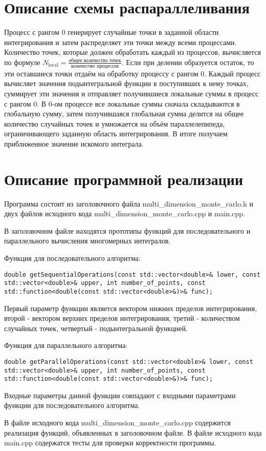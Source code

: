 \documentclass{report}
\begin{document}
\section*{Описание схемы распараллеливания}
\par Процесс с рангом 0 генерирует случайные точки в заданной области интегрирования и затем распределяет эти точки между всеми процессами. Количество точек, которые должен обработать каждый из процессов, вычисляется по формуле $N_{\text{local}} = \frac{\text{общее количество точек}}{\text{количество процессов}}$. Если при делении образуется остаток, то эти оставшиеся точки отдаём на обработку процессу с рангом 0. Каждый процесс вычисляет значения подынтегральной функции в поступивших к нему точках, суммирует эти значения и отправляет получившиеся локальные суммы в процесс с рангом 0. В 0-ом процессе все локальные суммы сначала складываются в глобальную сумму, затем получившаяся глобальная сумма делится на общее количество случайных точек и умножается на объём параллелепипеда, ограничивающего заданную область интегрирования. В итоге получаем приближенное значение искомого интеграла.

\newpage

\section*{Описание программной реализации}
Программа состоит из заголовочного файла multi\_dimension\_monte\_carlo.h и двух файлов исходного кода multi\_dimension\_monte\_carlo.cpp и main.cpp.
\par В заголовочном файле находятся прототипы функций для последовательного и параллельного вычисления многомерных интегралов.
\par Функция для последовательного алгоритма:
\begin{lstlisting}
double getSequentialOperations(const std::vector<double>& lower, const
std::vector<double>& upper, int number_of_points, const std::function<double(const std::vector<double>&)>& func);
\end{lstlisting}
Первый параметр функции является вектором нижних пределов интегрирования, второй - вектором верхних пределов интегрирования, третий - количеством случайных точек, четвертый - подынтегральной функцией.
\par Функция для параллельного
алгоритма:
\begin{lstlisting}
double getParallelOperations(const std::vector<double>& lower, const
std::vector<double>& upper, int number_of_points, const std::function<double(const std::vector<double>&)>& func); 
\end{lstlisting}
Входные параметры данной функции совпадают с входными параметрами функции для последовательного алгоритма.
\par В файле исходного кода multi\_dimension\_monte\_carlo.cpp содержится реализация функций, объявленных в заголовочном файле. В файле исходного кода main.cpp содержатся тесты для проверки корректности программы.
\newpage
\end{document}
